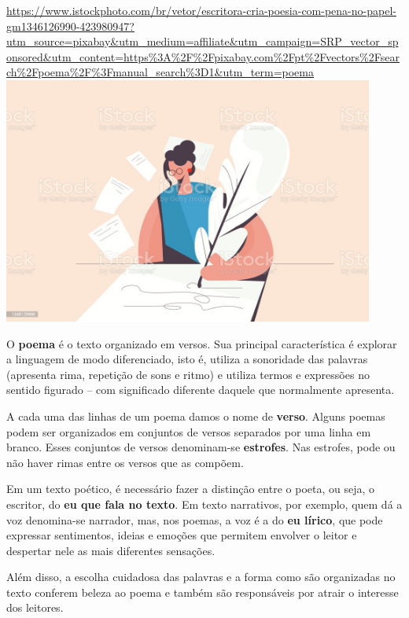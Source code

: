 \href{https://www.istockphoto.com/br/vetor/escritora-cria-poesia-com-pena-no-papel-gm1346126990-423980947?utm_source=pixabay\&utm_medium=affiliate\&utm_campaign=SRP_vector_sponsored\&utm_content=https\%3A\%2F\%2Fpixabay.com\%2Fpt\%2Fvectors\%2Fsearch\%2Fpoema\%2F\%3Fmanual_search\%3D1\&utm_term=poema}{https://www.istockphoto.com/br/vetor/escritora-cria-poesia-com-pena-no-papel-gm1346126990-423980947?utm\_source=pixabay\&utm\_medium=affiliate\&utm\_campaign=SRP\_vector\_sponsored\&utm\_content=https\%3A\%2F\%2Fpixabay.com\%2Fpt\%2Fvectors\%2Fsearch\%2Fpoema\%2F\%3Fmanual\_search\%3D1\&utm\_term=poema\includegraphics[width=4.80139in,height=3.19792in]{media/image15.jpeg}}

O \textbf{poema} é o texto organizado em
versos. Sua principal característica é explorar a linguagem de modo
diferenciado, isto é, utiliza a sonoridade das palavras (apresenta rima,
repetição de sons e ritmo) e utiliza termos e expressões no sentido
figurado -- com significado diferente daquele que normalmente apresenta.

A cada uma das linhas de um poema damos o nome de \textbf{verso}. Alguns poemas
podem ser organizados em conjuntos de versos separados por uma linha em
branco. Esses conjuntos de versos denominam-se \textbf{estrofes}. Nas
estrofes, pode ou não haver rimas entre os versos que as compõem.

Em um texto poético, é necessário fazer a distinção entre o poeta, ou
seja, o escritor, do \textbf{eu que fala no texto}. Em texto narrativos, por
exemplo, quem dá a voz denomina-se narrador, mas, nos poemas, a voz
é a do \textbf{eu lírico}, que pode expressar
sentimentos, ideias e emoções que permitem envolver o leitor e
despertar nele as mais diferentes sensações.

Além disso, a escolha
cuidadosa das palavras e a forma como são organizadas no texto conferem
beleza ao poema e também são responsáveis por atrair o interesse dos
leitores.

